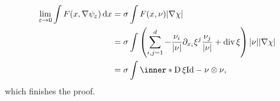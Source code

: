 \begin{align*}
	\lim_{ \varepsilon \to 0 }
		\int
			F ( x, \nabla \psi_{ \varepsilon } )
		\dd{ x }
	& =
	\sigma
	\int
		F ( x , \nu )
	\abs{ \nabla \chi }
	\\
	& = 
	\sigma
	\int
		\left(
			\sum_{ i, j = 1}^{ d }
				-
				\frac{ \nu_{ i } }{ \abs{ \nu } }
				\partial_{ x_{ i } } \xi^{ j }
				\frac{ \nu_{ j } }{ \abs{ \nu } }
			+
			\divg \xi 
		\right)
		\abs{ \nu }
	\abs{ \nabla \chi }
	\\
	& =
	\sigma
	\int
		\inner*{ \diff \xi }{ \mathrm{Id} - \nu \otimes \nu },
\end{align*}
which finishes the proof.